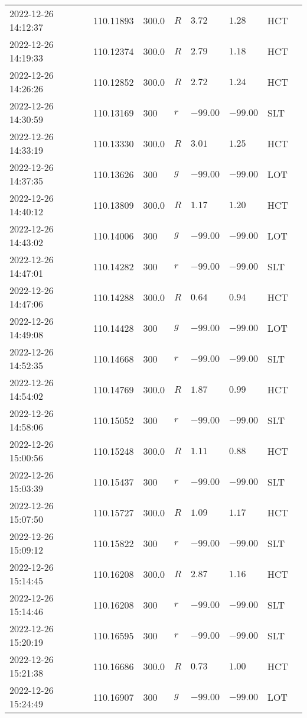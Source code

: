 \documentclass{nature_plusfigure}
\begin{document}
\begin{supplement}
\begin{center}
\begin{longtable}{llllllll}
2022-12-26 14:12:37 & 110.11893 & 300.0 & $R$ & $3.72$ & $1.28$ & HCT &  \\ 
2022-12-26 14:19:33 & 110.12374 & 300.0 & $R$ & $2.79$ & $1.18$ & HCT &  \\ 
2022-12-26 14:26:26 & 110.12852 & 300.0 & $R$ & $2.72$ & $1.24$ & HCT &  \\ 
2022-12-26 14:30:59 & 110.13169 & 300 & $r$ & $-99.00$ & $-99.00$ & SLT &  \\ 
2022-12-26 14:33:19 & 110.13330 & 300.0 & $R$ & $3.01$ & $1.25$ & HCT &  \\ 
2022-12-26 14:37:35 & 110.13626 & 300 & $g$ & $-99.00$ & $-99.00$ & LOT &  \\ 
2022-12-26 14:40:12 & 110.13809 & 300.0 & $R$ & $1.17$ & $1.20$ & HCT &  \\ 
2022-12-26 14:43:02 & 110.14006 & 300 & $g$ & $-99.00$ & $-99.00$ & LOT &  \\ 
2022-12-26 14:47:01 & 110.14282 & 300 & $r$ & $-99.00$ & $-99.00$ & SLT &  \\ 
2022-12-26 14:47:06 & 110.14288 & 300.0 & $R$ & $0.64$ & $0.94$ & HCT &  \\ 
2022-12-26 14:49:08 & 110.14428 & 300 & $g$ & $-99.00$ & $-99.00$ & LOT &  \\ 
2022-12-26 14:52:35 & 110.14668 & 300 & $r$ & $-99.00$ & $-99.00$ & SLT &  \\ 
2022-12-26 14:54:02 & 110.14769 & 300.0 & $R$ & $1.87$ & $0.99$ & HCT &  \\ 
2022-12-26 14:58:06 & 110.15052 & 300 & $r$ & $-99.00$ & $-99.00$ & SLT &  \\ 
2022-12-26 15:00:56 & 110.15248 & 300.0 & $R$ & $1.11$ & $0.88$ & HCT &  \\ 
2022-12-26 15:03:39 & 110.15437 & 300 & $r$ & $-99.00$ & $-99.00$ & SLT &  \\ 
2022-12-26 15:07:50 & 110.15727 & 300.0 & $R$ & $1.09$ & $1.17$ & HCT &  \\ 
2022-12-26 15:09:12 & 110.15822 & 300 & $r$ & $-99.00$ & $-99.00$ & SLT &  \\ 
2022-12-26 15:14:45 & 110.16208 & 300.0 & $R$ & $2.87$ & $1.16$ & HCT &  \\ 
2022-12-26 15:14:46 & 110.16208 & 300 & $r$ & $-99.00$ & $-99.00$ & SLT &  \\ 
2022-12-26 15:20:19 & 110.16595 & 300 & $r$ & $-99.00$ & $-99.00$ & SLT &  \\ 
2022-12-26 15:21:38 & 110.16686 & 300.0 & $R$ & $0.73$ & $1.00$ & HCT &  \\ 
2022-12-26 15:24:49 & 110.16907 & 300 & $g$ & $-99.00$ & $-99.00$ & LOT &  \\ 

\end{longtable}
\end{center}
\end{supplement}
\end{document}
